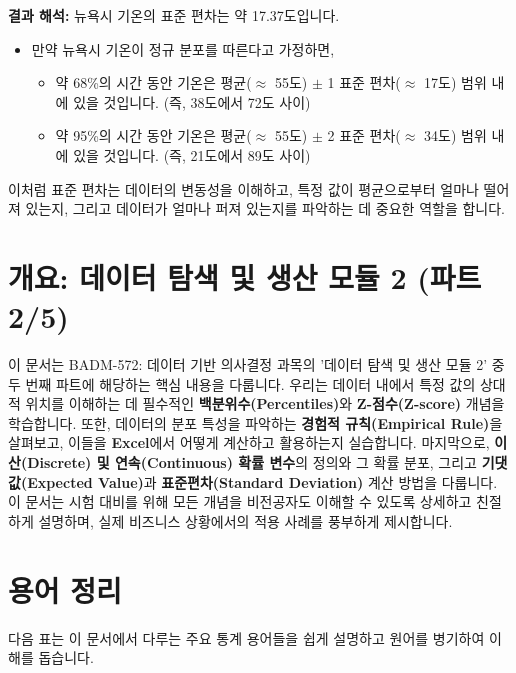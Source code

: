 \documentclass[11pt,a4paper]{article}
\theoremstyle{definition}
\begin{document}
\begin{examplebox}[title={Excel에서 표준 편차 계산하기 (\texttt{STDEV.S} 함수)}]
\textbf{결과 해석:}
뉴욕시 기온의 표준 편차는 약 17.37도입니다.
\begin{itemize}
    \item 만약 뉴욕시 기온이 정규 분포를 따른다고 가정하면,
    \begin{itemize}
        \item 약 68\%의 시간 동안 기온은 평균($\approx$ 55도) $\pm$ 1 표준 편차($\approx$ 17도) 범위 내에 있을 것입니다. (즉, 38도에서 72도 사이)
        \item 약 95\%의 시간 동안 기온은 평균($\approx$ 55도) $\pm$ 2 표준 편차($\approx$ 34도) 범위 내에 있을 것입니다. (즉, 21도에서 89도 사이)
    \end{itemize}
\end{itemize}
이처럼 표준 편차는 데이터의 변동성을 이해하고, 특정 값이 평균으로부터 얼마나 떨어져 있는지, 그리고 데이터가 얼마나 퍼져 있는지를 파악하는 데 중요한 역할을 합니다.
\end{examplebox}

\newpage

\newpage
\section{개요: 데이터 탐색 및 생산 모듈 2 (파트 2/5)}

\begin{overviewbox}
이 문서는 BADM-572: 데이터 기반 의사결정 과목의 '데이터 탐색 및 생산 모듈 2' 중 두 번째 파트에 해당하는 핵심 내용을 다룹니다. 우리는 데이터 내에서 특정 값의 상대적 위치를 이해하는 데 필수적인 \textbf{백분위수(Percentiles)}와 \textbf{Z-점수(Z-score)} 개념을 학습합니다. 또한, 데이터의 분포 특성을 파악하는 \textbf{경험적 규칙(Empirical Rule)}을 살펴보고, 이들을 \textbf{Excel}에서 어떻게 계산하고 활용하는지 실습합니다. 마지막으로, \textbf{이산(Discrete) 및 연속(Continuous) 확률 변수}의 정의와 그 확률 분포, 그리고 \textbf{기댓값(Expected Value)}과 \textbf{표준편차(Standard Deviation)} 계산 방법을 다룹니다. 이 문서는 시험 대비를 위해 모든 개념을 비전공자도 이해할 수 있도록 상세하고 친절하게 설명하며, 실제 비즈니스 상황에서의 적용 사례를 풍부하게 제시합니다.
\end{overviewbox}

\newpage
\section{용어 정리}

다음 표는 이 문서에서 다루는 주요 통계 용어들을 쉽게 설명하고 원어를 병기하여 이해를 돕습니다.
\end{document}
